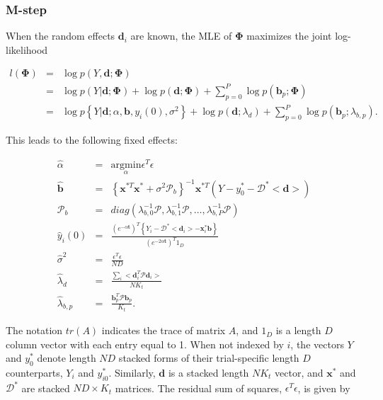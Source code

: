 \documentclass[preprint]{JASA}
\begin{document}
\hypertarget{m-step}{%
\subsubsection{M-step}\label{m-step}}

When the random effects \(\mathbf{d}_i\) are known, the MLE of
\(\mathbf{\Phi}\) maximizes the joint log-likelihood

\begin{eqnarray*}
l(\mathbf{\Phi}) &=& \log p(Y,  \mathbf{d} ; \mathbf{\Phi})\\
&=&  \log p(Y|  \mathbf{d} ; \mathbf{\Phi}) + \log p(\mathbf{d}; \mathbf{\Phi}) + \sum_{p = 0}^P\log p(\mathbf{b}_p; \mathbf{\Phi})\\
&=&  \log p\left\{Y|  \mathbf{d} ; \alpha, \mathbf{b}, y_i(0), \sigma^2\right\} + \log p(\mathbf{d} ; \lambda_d) + \sum_{p = 0}^P\log p(\mathbf{b}_p ; \lambda_{b, p}).
\end{eqnarray*}

\noindent This leads to the following fixed effects:

\begin{eqnarray*}
\hat{\alpha} &=& \underset{\alpha}{\mathrm{argmin }}\epsilon^T\epsilon\\[5mm]
\widehat{\mathbf{b}} &=& \left\{\mathbf{x}^{*T}\mathbf{x}^* + \sigma^2\mathcal{P}_b \right\}^{-1}\mathbf{x}^{*T}\left(Y - y_{0}^* - \bm{\mathcal{D}}^*<\mathbf{d}> \right)\\[5mm]
\mathcal{P}_b &=& diag\left(\lambda_{b, 0}^{-1}\mathcal{P}, \lambda_{b, 1}^{-1}\mathcal{P}, \ldots,  \lambda_{b, P}^{-1}\mathcal{P} \right)\\[5mm]
\widehat{y}_i(0) &=& \frac{(e^{-\alpha\mathbf{t}} )^T \left\{Y_i -  \mathcal{D}^*<\mathbf{d}_i> - \mathbf{x}_i^*\mathbf{b} \right\}}{(e^{-2\alpha\mathbf{t}})^T 1_{D}}\\[5mm]
\widehat{\sigma}^2 &=& \frac{\epsilon^T\epsilon}{ND}\\[5mm]
\widehat{\lambda}_d &=& \frac{\sum_i <\mathbf{d}_i^T\mathcal{P}\mathbf{d}_i>}{NK_t}\\[5mm]
\widehat{\lambda}_{b, p} &=&\frac{ \mathbf{b}_p^T\mathcal{P}\mathbf{b}_p}{K_t}.
\end{eqnarray*}

\noindent The notation \(tr(A)\) indicates the trace of matrix \(A\),
and \(1_{D}\) is a length \(D\) column vector with each entry equal to
1. When not indexed by \(i\), the vectors \(Y\) and \(y_0^*\) denote
length \(ND\) stacked forms of their trial-specific length \(D\)
counterparts, \(Y_i\) and \(y_{i0}^*\). Similarly, \(\mathbf{d}\) is a
stacked length \(NK_t\) vector, and \(\mathbf{x}^*\) and
\(\bm{\mathcal{D}}^*\) are stacked \(ND \times K_t\) matrices. The
residual sum of squares, \(\epsilon^T\epsilon\), is given by
\end{document}
